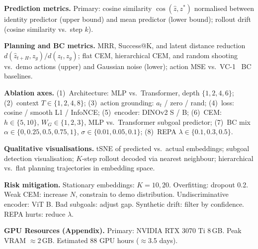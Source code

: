 \documentclass[10pt,twocolumn,letterpaper]{article}
\begin{document}
\noindent\textbf{Prediction metrics.}
Primary: cosine similarity $\cos(\hat{z},z^*)$ normalised between identity predictor (upper bound) and mean predictor (lower bound); rollout drift (cosine similarity vs.\ step $k$).

\noindent\textbf{Planning and BC metrics.}
MRR, Success@K, and latent distance reduction $d(\hat{z}_{t+H},z_g)/d(z_t,z_g)$; flat CEM, hierarchical CEM, and random shooting vs.\ demo actions (upper) and Gaussian noise (lower); action MSE vs.\ VC-1~\cite{vc1} BC baselines.

\noindent\textbf{Ablation axes.}
(1)~Architecture: MLP vs.\ Transformer, depth $\{1,2,4,6\}$; (2)~context $T\!\in\!\{1,2,4,8\}$; (3)~action grounding: $a_t$ / zero / rand; (4)~loss: cosine / smooth L1 / InfoNCE; (5)~encoder: DINOv2 S / B; (6)~CEM: $h\!\in\!\{5,10\}$, $W_G\!\in\!\{1,2,3\}$, MLP vs.\ Transformer subgoal predictor; (7)~BC mix $\alpha\!\in\!\{0,0.25,0.5,0.75,1\}$, $\sigma\!\in\!\{0.01,0.05,0.1\}$; (8)~REPA $\lambda\!\in\!\{0.1,0.3,0.5\}$.

\noindent\textbf{Qualitative visualisations.}
t\text{-}SNE of predicted vs.\ actual embeddings; subgoal detection visualisation; $K$-step rollout decoded via nearest neighbour; hierarchical vs.\ flat planning trajectories in embedding space.

\noindent\textbf{Risk mitigation.}
Stationary embeddings: $K{=}10,20$. Overfitting: dropout 0.2. Weak CEM: increase $N$, constrain to demo distribution. Undiscriminative encoder: ViT B. Bad subgoals: adjust gap. Synthetic drift: filter by confidence. REPA hurts: reduce $\lambda$.

\noindent\textbf{GPU Resources (Appendix).}
Primary: NVIDIA RTX 3070 Ti 8\,GB. Peak VRAM ${\approx}2$\,GB. Estimated 88 GPU hours (${\approx}$3.5 days).

{\small


}
\end{document}
